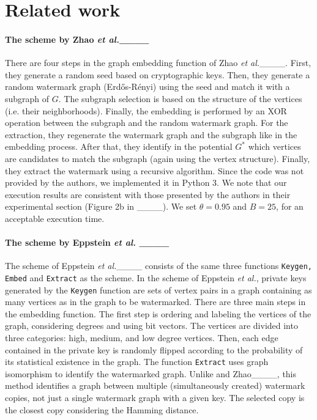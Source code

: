 \section{Related work}
\label{ss:Zhao-Eppstein}

\paragraph*{The scheme by Zhao \textit{et al.}____} There are four steps in the graph embedding function of Zhao \textit{et al.}____.
First, they generate a random seed based on cryptographic keys. Then, they generate a random watermark graph (Erdős-Rényi) using the seed and match it with a subgraph of $G$. The subgraph selection is based on the structure of the vertices (i.e. their neighborhoods). Finally, the embedding is performed by an XOR operation between the subgraph and the random watermark graph.
For the extraction, they regenerate the watermark graph and the subgraph like in the embedding process. After that, they identify in the potential $G^*$ which vertices are candidates to match the subgraph (again using the vertex structure). Finally, they extract the watermark using a recursive algorithm.
Since the code was not provided by the authors, we implemented it in Python 3. We note that our execution results are consistent with those presented by the authors in their experimental section (Figure 2b in ____). We set $\theta=0.95$ and $B=25$, for an acceptable execution time.

\paragraph*{The scheme by Eppstein \textit{et al.} ____} The scheme of Eppstein \textit{et al.}____ consists of the same three functions \texttt{Keygen,} \texttt{Embed} and \texttt{Extract} as the \scheme scheme. In the scheme of Eppstein \textit{et al.}, private keys generated by the \texttt{Keygen} function are sets of vertex pairs in a graph containing as many vertices as in the graph to be watermarked. There are three main steps in the embedding function. The first step is ordering and labeling the vertices of the graph, considering degrees and using bit vectors. The vertices are divided into three categories: high, medium, and low degree vertices. Then, each edge contained in the private key is randomly flipped according to the probability of its statistical existence in the graph. The function \texttt{Extract} uses graph isomorphism to identify the watermarked graph. Unlike \scheme and Zhao____, this method identifies a graph between multiple (simultaneously created) watermark copies, not just a single watermark graph with a given key. The selected copy is the closest copy considering the Hamming distance.
